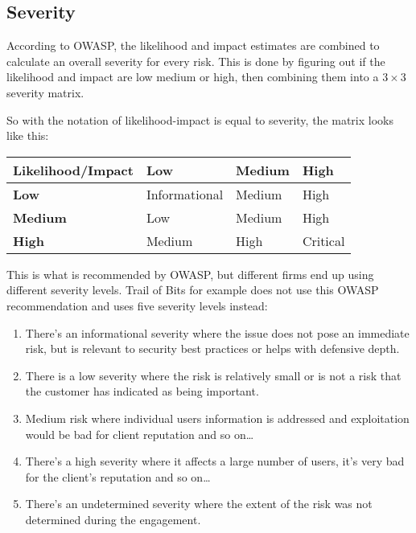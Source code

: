 \subsection{Severity}\label{severity}

According to OWASP, the likelihood and impact estimates are combined to
calculate an overall severity for every risk. This is done by figuring
out if the likelihood and impact are low medium or high, then combining
them into a $3\times 3$ severity matrix.

So with the notation of likelihood-impact is equal to severity, the
matrix looks like this:

\begin{longtable}[]{@{}llll@{}}
\toprule\noalign{}
Likelihood/Impact & \textbf{Low} & \textbf{Medium} & \textbf{High} \\
\midrule\noalign{}
\endhead
\bottomrule\noalign{}
\endlastfoot
\textbf{Low} & Informational & Medium & High \\
\textbf{Medium} & Low & Medium & High \\
\textbf{High} & Medium & High & Critical \\
\end{longtable}

This is what is recommended by OWASP, but different firms end up using
different severity levels. Trail of Bits for example does not use this
OWASP recommendation and uses five severity levels instead:

\begin{enumerate}
\def\labelenumi{\arabic{enumi}.}
\tightlist
\item
  There's an informational severity where the issue does not pose an
  immediate risk, but is relevant to security best practices or helps
  with defensive depth.
\item
  There is a low severity where the risk is relatively small or is not a
  risk that the customer has indicated as being important.
\item
  Medium risk where individual users information is addressed and
  exploitation would be bad for client reputation and so on\ldots{}
\item
  There's a high severity where it affects a large number of users, it's
  very bad for the client's reputation and so on\ldots{}
\item
  There's an undetermined severity where the extent of the risk was not
  determined during the engagement.
\end{enumerate}

